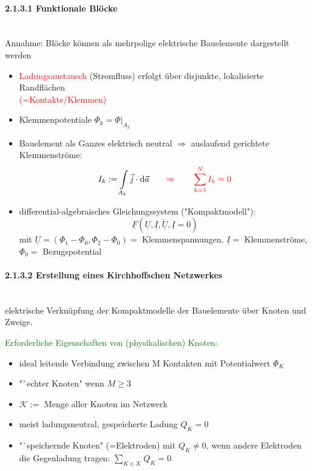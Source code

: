 \documentclass[]{article}
\newcommand{\dd}{\ensuremath{\text{d}}}
\begin{document}
\newpage

\paragraph{2.1.3.1 Funktionale Blöcke}
	\ \\Annahme: Blöcke können als mehrpolige elektrische Bauelemente dargestellt werden

	\begin{itemize}
		\item 
			\textcolor{red}{Ladungsaustausch} (Stromfluss) erfolgt über disjunkte, lokalisierte Randflächen \\\textcolor{red}{(=Kontakte/Klemmen)}
		\item 
			Klemmenpotentiale $\Phi_k=\left. \Phi\right |_{A_k}$
		\item 
			Bauelement als Ganzes elektrisch neutral $\Rightarrow$ auslaufend gerichtete Klemmenströme: $$I_k:=\int\limits_{A_k} \vec{j}\cdot \dd \vec{a} \qquad \textcolor{red}{\Rightarrow \qquad \sum\limits_{k=1}^N I_k=0}$$
		\item 
			differential-algebraisches Gleichungssystem ("Kompaktmodell"):
			$$\underline{F}(\underline{U},\underline{I},\underline{\dot{U}},\underline{\dot{I}}=0)$$
			mit $\underline{U}=(\Phi_1-\Phi_0,\Phi_2-\Phi_0)=$ Klemmenspannungen, $\underline{I}=$ Klemmenströme, \\$\Phi_0=$ Bezugspotential
	\end{itemize}
	
\newpage	

\paragraph{2.1.3.2 Erstellung eines Kirchhoffschen Netzwerkes}
	\ \\elektrische Verknüpfung der Kompaktmodelle der Bauelemente über Knoten und Zweige.



	\textcolor{Green}{Erforderliche Eigenschaften von (physikalischen) Knoten: }
	
	\begin{boxedminipage}[Green]{\textwidth}
	
	\begin{itemize}
		\item 
			ideal leitende Verbindung zwischen M Kontakten mit Potentialwert $\Phi_K$
		\item 
			"`echter Knoten" wenn $M \geq 3$
		\item 
			$\mathcal K:=$ Menge aller Knoten im Netzwerk 
		\item 
			meist ladungsneutral, gespeicherte Ladung $Q_K=0$
		\item 
			"`speichernde Knoten" (=Elektroden) mit $Q_K\not= 0$, wenn andere Elektroden die Gegenladung tragen: $\sum\limits_{K\in \mathcal K} Q_K=0$
	\end{itemize}
\end{boxedminipage}
\end{document}
